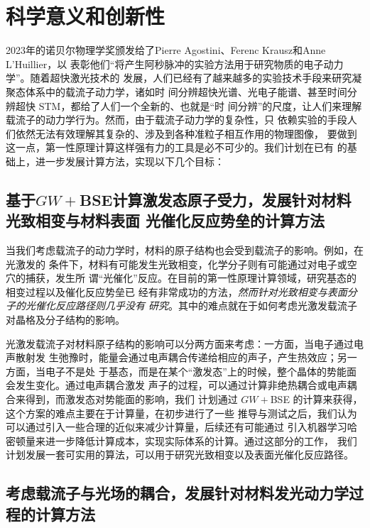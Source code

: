 \setcounter{section}{0}

\section{科学意义和创新性}

2023年的诺贝尔物理学奖颁发给了Pierre Agostini、Ferenc Krausz和Anne L'Huillier，以
表彰他们``将产生阿秒脉冲的实验方法用于研究物质的电子动力学''。随着超快激光技术的
发展，人们已经有了越来越多的实验技术手段来研究凝聚态体系中的载流子动力学，诸如时
间分辨超快光谱、光电子能谱、甚至时间分辨超快 STM，都给了人们一个全新的、也就是“时
间分辨”的尺度，让人们来理解载流子的动力学行为。然而，由于载流子动力学的复杂性，只
依赖实验的手段人们依然无法有效理解其复杂的、涉及到各种准粒子相互作用的物理图像，
要做到这一点，第一性原理计算这样强有力的工具是必不可少的。我们计划在\hnamd{}已有
的基础上，进一步发展计算方法，实现以下几个目标：

\subsection{基于$GW+{}$BSE计算激发态原子受力，发展针对材料光致相变与材料表面
  光催化反应势垒的计算方法}


当我们考虑载流子的动力学时，材料的原子结构也会受到载流子的影响。例如，在光激发的
条件下，材料有可能发生光致相变，化学分子则有可能通过对电子或空穴的捕获，发生所
谓“光催化”反应。在目前的第一性原理计算领域，研究基态的相变过程以及催化反应势垒已
经有非常成功的方法，\emph{然而针对光致相变与表面分子的光催化反应路径则几乎没有
  研究}。其中的难点就在于如何考虑光激发载流子对晶格及分子结构的影响。

光激发载流子对材料原子结构的影响可以分两方面来考虑：一方面，当电子通过电声散射发
生弛豫时，能量会通过电声耦合传递给相应的声子，产生热效应；另一方面，当电子不是处
于基态，而是在某个“激发态”上的时候，整个晶体的势能面会发生变化。通过电声耦合激发
声子的过程，可以通过计算非绝热耦合或电声耦合来得到，而激发态对势能面的影响，我们
计划通过 $GW+{}$BSE 的计算来获得，这个方案的难点主要在于计算量，在初步进行了一些
推导与测试之后，我们认为可以通过引入一些合理的近似来减少计算量，后续还有可能通过
引入机器学习哈密顿量来进一步降低计算成本，实现实际体系的计算。通过这部分的工作，
我们计划发展一套可实用的算法，可以用于研究光致相变以及表面光催化反应路径。

\subsection{考虑载流子与光场的耦合，发展针对材料发光动力学过程的计算方法}


